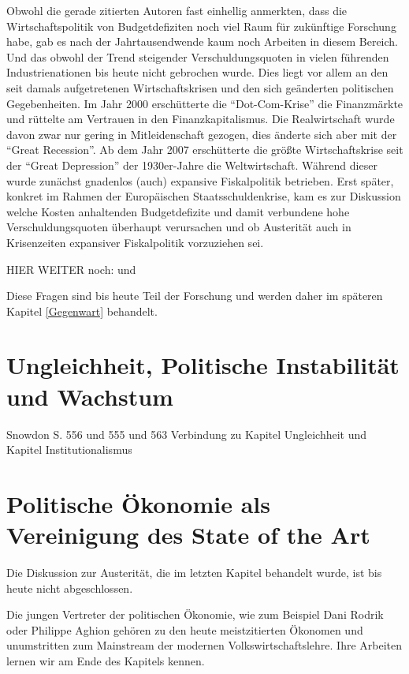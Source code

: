 Obwohl die gerade zitierten Autoren fast einhellig anmerkten, dass die Wirtschaftspolitik von Budgetdefiziten noch viel Raum für zukünftige Forschung habe, gab es nach der Jahrtausendwende kaum noch Arbeiten in diesem Bereich. Und das obwohl der Trend steigender Verschuldungsquoten in vielen führenden Industrienationen bis heute nicht gebrochen wurde. Dies liegt vor allem an den seit damals aufgetretenen Wirtschaftskrisen und den sich geänderten politischen Gegebenheiten. Im Jahr 2000 erschütterte die "`Dot-Com-Krise"' die Finanzmärkte und rüttelte am Vertrauen in den Finanzkapitalismus. Die Realwirtschaft wurde davon zwar nur gering in Mitleidenschaft gezogen, dies änderte sich aber mit der "`Great Recession"'. Ab dem Jahr 2007 erschütterte die größte Wirtschaftskrise seit der "`Great Depression"' der 1930er-Jahre die Weltwirtschaft. Während dieser wurde zunächst gnadenlos (auch) expansive Fiskalpolitik betrieben. Erst später, konkret im Rahmen der Europäischen Staatsschuldenkrise, kam es zur Diskussion welche Kosten anhaltenden Budgetdefizite und damit verbundene hohe Verschuldungsquoten überhaupt verursachen und ob Austerität auch in Krisenzeiten expansiver Fiskalpolitik vorzuziehen sei.

HIER WEITER noch: \parencite{Alesina2000} und \textcite{Yared2019}


Diese Fragen sind bis heute Teil der Forschung und werden daher im späteren Kapitel \ref{Gegenwart} behandelt.


\section{Ungleichheit, Politische Instabilität und Wachstum}


Snowdon S. 556 und 555 und 563 Verbindung zu Kapitel Ungleichheit und Kapitel Institutionalismus

\textcite{Alesina1996}
\textcite{Alesina1994}
\textcite{Deininger1996}
\textcite{Aghion1999}
\textcite{Hirschman1973}
\textcite{Alesina1994a}




\section{Politische Ökonomie als Vereinigung des State of the Art}

Die Diskussion zur Austerität, die im letzten Kapitel behandelt wurde, ist bis heute nicht abgeschlossen. 

Die jungen Vertreter der politischen Ökonomie, wie zum Beispiel Dani Rodrik oder Philippe Aghion gehören zu den heute meistzitierten Ökonomen und unumstritten zum Mainstream der modernen Volkswirtschaftslehre. Ihre Arbeiten lernen wir am Ende des Kapitels kennen. 


